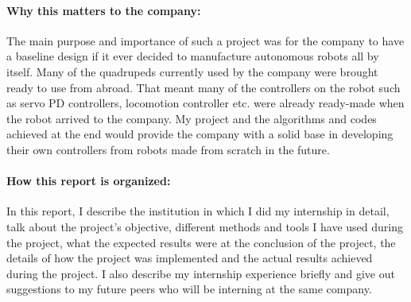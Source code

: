 \documentclass[12pt]{article}
\begin{document}
\paragraph{Why this matters to the company:} The main purpose and importance of such a project was for the company to have a baseline design if it ever decided to manufacture autonomous robots all by itself. Many of the quadrupeds currently used by the company were brought ready to use from abroad. That meant many of the controllers on the robot such as servo PD controllers, locomotion controller etc. were already ready-made when the robot  arrived to the company. My project and the algorithms and codes achieved at the end would provide the company with a solid base in developing their own controllers from robots made from scratch in the future.
\paragraph{How this report is organized:} In this report, I describe the institution in which I did my internship in detail, talk about the project's objective, different methods and tools I have used during the project, what the expected results were at the conclusion of the project, the details of how the project was implemented and the actual results achieved during the project. I also describe my internship experience briefly and give out suggestions to my future peers who will be interning at the same company.
\end{document}
